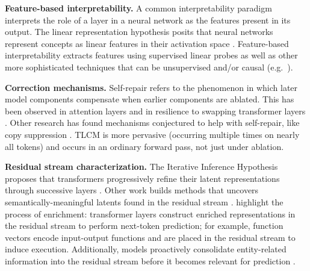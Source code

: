 \label{sec:recent-work}

\textbf{Feature-based interpretability.}
A common interpretability paradigm interprets the role of a layer in a neural network as the features present in its output.
The linear representation hypothesis posits that neural networks represent concepts as linear features in their activation space \citep{mikolov2013linguistic, olah2020zoom}. 
Feature-based interpretability extracts features using supervised linear probes \citep{alain2016understanding} as well as other more sophisticated techniques that can be unsupervised and/or causal (e.g.~\citet{nostalgebraist, burns2022discovering, geiger2024finding, bricken2023monosemanticity}). 

\textbf{Correction mechanisms.}
Self-repair refers to the phenomenon in which later model components compensate when earlier components are ablated. This has been observed in attention layers \citep{lad2024remarkable, mcgrath2023hydraeffectemergentselfrepair, rushing2024explorations} and in resilience to swapping transformer layers \citep{lad2024remarkable}. Other research has found mechanisms conjectured to help with self-repair, like copy suppression \citep{mcdougall2024copy}. TLCM is more pervasive (occurring multiple times on nearly all tokens) and occurs in an ordinary forward pass, not just under ablation.


\textbf{Residual stream characterization.} The Iterative Inference Hypothesis proposes that transformers progressively refine their latent representations through successive layers \cite{brothers2024uncoveringuncertaintytransformerinference}. Other work builds methods that uncovers semantically-meaningful latents found in the residual stream \cite{belrose2023elicitinglatentpredictionstransformers}. \citet{todd2024function} highlight the process of enrichment: transformer layers construct enriched representations in the residual stream to perform next-token prediction; for example, function vectors encode input-output functions and are placed in the residual stream to induce execution. Additionally, models proactively consolidate entity-related information into the residual stream before it becomes relevant for prediction \cite{hernandez2024linearity, DBLP:conf/acl/LiNA20, hernandez2024inspectingeditingknowledgerepresentations, geva2023dissectingrecallfactualassociations, hendel2023incontextlearningcreatestask, skean2025layerlayeruncoveringhidden}.